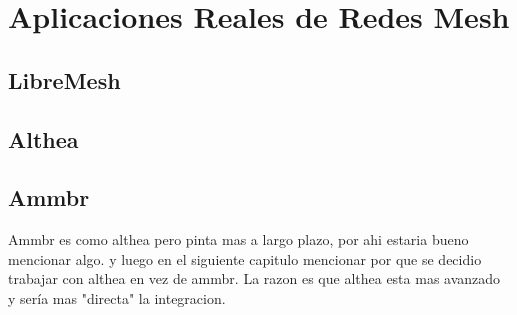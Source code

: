
\chapter{Aplicaciones Reales de Redes Mesh} %

\label{Chapter1} %

\section{LibreMesh}

\section{Althea}

\section{Ammbr}

Ammbr es como althea pero pinta mas a largo plazo, por ahi estaria bueno mencionar algo. y luego en el siguiente capitulo mencionar por que se decidio trabajar con althea en vez de ammbr. La razon es que althea esta mas avanzado y sería mas "directa" la integracion.